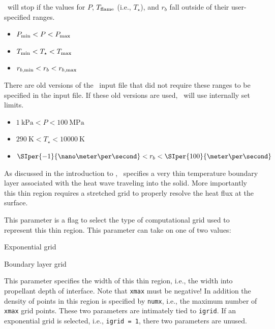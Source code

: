 \Rocburn\ will stop if the values for $P$, $T_{\rm flame}$ (i.e., $T_\star$), and $r_b$ fall outside of their user-specified ranges. 

\begin{itemize}
\item{$P_{\rm min} < P < P_{\rm max}$}
\item{$T_{\rm min} < T_\star < T_{\rm max}$}
\item{$r_{b,{\rm min}} < r_b < r_{b, {\rm max}}$}
\end{itemize}

There are old versions of the \Rocburn\ input file that did not require these ranges to be specified in the input file. If these old versions are used, \Rocburn\ will use internally set limits.

\begin{itemize}
\item{$\SI{1}{\kilo\pascal} < P < \SI{100}{\mega\pascal}$}
\item{$\SI{290}{\kelvin} < T_\star < \SI{10 000}{\kelvin}$}
\item{$\SIper{-1}{\nano\meter\per\second} < r_b < \SIper{100}{\meter\per\second}$}
\end{itemize}


As discussed in the introduction to , \Rocburn\ specifies a very thin temperature boundary layer associated with the heat wave traveling into the solid. More importantly this thin region requires a stretched grid to properly resolve the heat flux at the surface.

 This parameter is a flag to select the type of computational grid used to represent this thin region. This parameter can take on one of two values:

\begin{description}[labelindent=1.5cm]
\item[1]{Exponential grid}
\item[2]{Boundary layer grid}
\end{description}

 This parameter specifies the width of this thin region, i.e., the width into propellant depth of interface. Note that \texttt{xmax} must be negative! In addition the density of points in this region is specified by \texttt{numx}, i.e., the maximum number of \texttt{xmax} grid points. These two parameters are intimately tied to \texttt{igrid}. If an exponential grid is selected, i.e., \texttt{igrid = 1}, there two parameters are unused.

